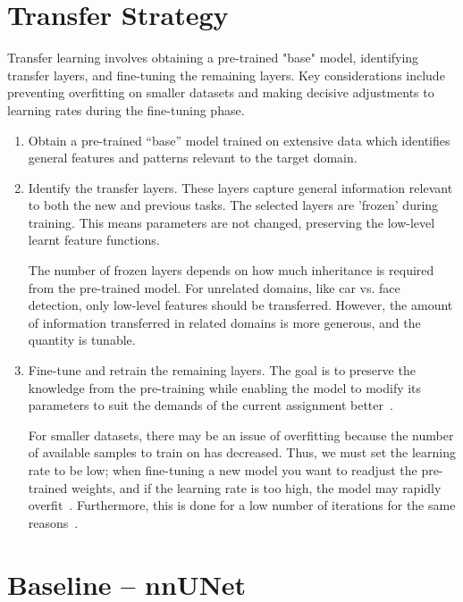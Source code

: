 \documentclass[11pt,twoside]{report}
\begin{document}
\section{Transfer Strategy}

Transfer learning involves obtaining a pre-trained "base" model, identifying transfer layers, and fine-tuning the remaining layers. Key considerations include preventing overfitting on smaller datasets and making decisive adjustments to learning rates during the fine-tuning phase.

\begin{enumerate}
  \item Obtain a pre-trained ``base'' model trained on extensive data which identifies general features and patterns relevant to the target domain.
  
  \item Identify the transfer layers. These layers capture general information relevant to both the new and previous tasks. The selected layers are 'frozen' during training. This means parameters are not changed, preserving the low-level learnt feature functions. 
  
  The number of frozen layers depends on how much inheritance is required from the pre-trained model. For unrelated domains, like car vs. face detection, only low-level features should be transferred. However, the amount of information transferred in related domains is more generous, and the quantity is tunable.
  
  \item Fine-tune and retrain the remaining layers. The goal is to preserve the knowledge from the pre-training while enabling the model to modify its parameters to suit the demands of the current assignment better~\cite{geeks-transfer-learning}.
  
  For smaller datasets, there may be an issue of overfitting because the number of available samples to train on has decreased. Thus, we must set the learning rate to be low; when fine-tuning a new model you want to readjust the pre-trained weights, and if the learning rate is too high, the model may rapidly overfit~\cite{geeks-transfer-learning}. Furthermore, this is done for a low number of iterations for the same reasons~\cite{deep-learning-book}.
\end{enumerate}

\section{Baseline -- nnUNet}
\end{document}
